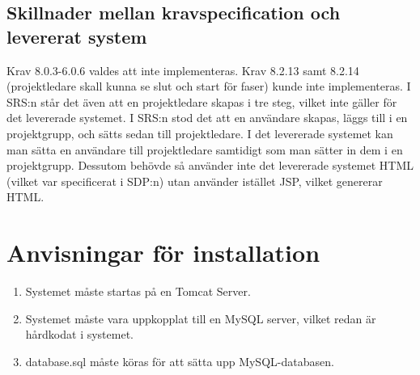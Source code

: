 \documentclass[paper=a4, fontsize=11pt,twoside]{article}
\begin{document}
\subsection{Skillnader mellan kravspecification och levererat system}
Krav 8.0.3-6.0.6 valdes att inte implementeras.
\flushleft
Krav 8.2.13 samt 8.2.14 (projektledare skall kunna se slut och start för faser) kunde inte implementeras. I SRS:n står det även att en projektledare skapas i tre steg, vilket inte gäller för det levererade systemet. I SRS:n stod det att en användare skapas, läggs till i en projektgrupp, och sätts sedan till projektledare. I det levererade systemet kan man sätta en användare till projektledare samtidigt som man sätter in dem i en projektgrupp. Dessutom behövde så använder inte det levererade systemet HTML (vilket var specificerat i SDP:n) utan använder istället JSP, vilket genererar HTML. 
\section{Anvisningar för installation}
\begin{enumerate}
\item
Systemet måste startas på en Tomcat Server.
\item
Systemet måste vara uppkopplat till en MySQL server, vilket redan är hårdkodat i systemet.
\item
database.sql måste köras för att sätta upp MySQL-databasen.
\end{enumerate}
\end{document}

